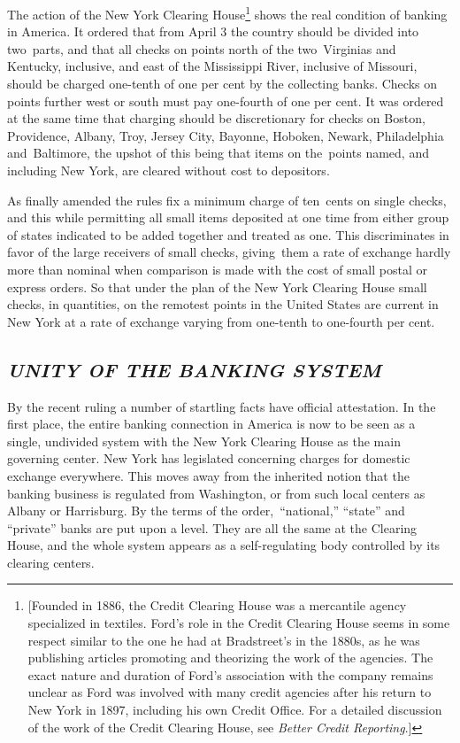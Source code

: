 \documentclass[twoside,symmetric,nobib,justified]{tufte-book}
\begin{document}
The action of the New York Clearing House\footnote{{[}Founded in 1886,
  the Credit Clearing House was a mercantile agency specialized in
  textiles. Ford's role in the Credit Clearing House seems in some
  respect similar to the one he had at Bradstreet's in the 1880s, as he
  was publishing articles promoting and theorizing the work of the
  agencies. The exact nature and duration of Ford's association with the
  company remains unclear as Ford was involved with many credit agencies
  after his return to New York in 1897, including his own Credit Office.
  For a detailed discussion of the work of the Credit Clearing House,
  see \emph{Better Credit Reporting}.{]}} shows the real condition of
banking in America. It ordered that from April 3 the country should be
divided into two~parts, and that all checks on points north of the
two~Virginias and Kentucky, inclusive, and east of the Mississippi
River, inclusive of Missouri, should be charged one-tenth of one per
cent by the collecting banks. Checks on points further west or south
must pay one-fourth of one per cent. It was ordered at the same time
that charging should be discretionary for checks on Boston, Providence,
Albany, Troy, Jersey City, Bayonne, Hoboken, Newark, Philadelphia
and~Baltimore, the upshot of this being that items on the~points named,
and including New York, are cleared without cost to depositors.~

As finally amended the rules fix a minimum charge of ten~cents on single
checks, and this while permitting all small items deposited at one time
from either group of states indicated to be added together and treated
as one. This discriminates in favor of the large receivers of small
checks, giving~them a rate of exchange hardly more than nominal when
comparison is made with the cost of small postal or express orders. So
that under the plan of the New York Clearing House small checks, in
quantities, on the remotest points in the United States are current in
New York at a rate of exchange varying from one-tenth to one-fourth per
cent.~



\hypertarget{unity-of-the-banking-system}{%
\subsection{\texorpdfstring{\emph{UNITY OF THE BANKING
SYSTEM}~}{UNITY OF THE BANKING SYSTEM~}}\label{unity-of-the-banking-system}}

By the recent ruling a number of startling facts have official
attestation. In the first place, the entire banking connection in
America is now to be seen as a single, undivided system with the New
York Clearing House as the main governing center. New York has
legislated concerning charges for domestic exchange everywhere. This
moves away from the inherited notion that the banking business is
regulated from Washington, or from such local centers as Albany or
Harrisburg. By the terms of the order,~``national,'' ``state'' and
``private'' banks are put upon a level. They are all the same at the
Clearing House, and the whole system appears as a self-regulating body
controlled by its clearing centers.~~
\end{document}
